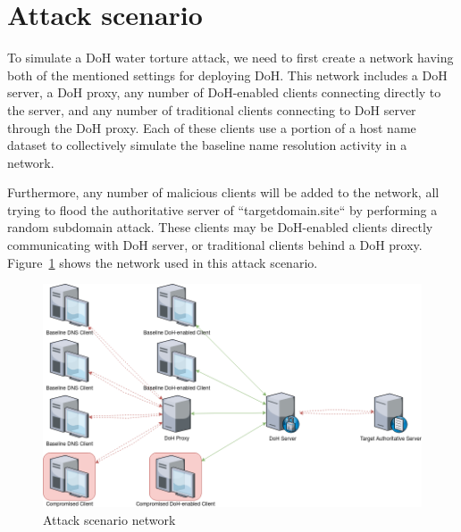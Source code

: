 \documentclass[11pt]{article}
\begin{document}
    \section{Attack scenario}

    To simulate a DoH water torture attack, we need to first create a network having both of the mentioned settings for deploying DoH. This network includes a DoH server, a DoH proxy, any number of DoH-enabled clients connecting directly to the server, and any number of traditional clients connecting to DoH server through the DoH proxy.
    Each of these clients use a portion of a host name dataset to collectively simulate the baseline name resolution activity in a network.

    Furthermore, any number of malicious clients will be added to the network, all trying to flood the authoritative server of ``targetdomain.site`` by performing a random subdomain attack.
    These clients may be DoH-enabled clients directly communicating with DoH server, or traditional clients behind a DoH proxy.
    Figure~\ref{fig:attack} shows the network used in this attack scenario.
    \begin{figure}[h]
        \includegraphics[width=\textwidth]{attack.png}
        \caption{Attack scenario network}
        \label{fig:attack}
    \end{figure}
\end{document}

